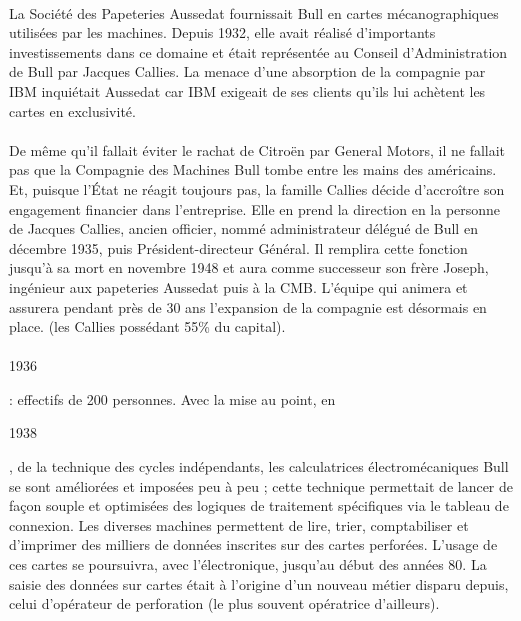 \documentclass{article}
\begin{document}
		\paragraph{}
		La Société des Papeteries Aussedat fournissait Bull en cartes mécanographiques utilisées par les machines. Depuis 
		1932, elle avait réalisé d'importants investissements dans ce domaine et était représentée au Conseil d'Administration 
		de Bull par Jacques Callies. La menace d'une absorption de la compagnie par IBM inquiétait Aussedat car IBM exigeait 
		de ses clients qu'ils lui achètent les cartes en exclusivité.
		\paragraph{}
		De même qu'il fallait éviter le rachat de Citroën par General Motors, il ne fallait pas que la Compagnie des Machines 
		Bull tombe entre les mains des américains. Et, puisque l'État ne réagit toujours pas, la famille Callies décide 
		d'accroître son engagement financier dans l'entreprise. Elle en prend la direction en la personne de Jacques Callies, 
		ancien officier, nommé administrateur délégué de Bull en décembre 1935, puis Président-directeur Général. Il remplira 
		cette fonction jusqu'à sa mort en novembre 1948 et aura comme successeur son frère Joseph, ingénieur aux papeteries 
		Aussedat puis à la CMB. L'équipe qui animera et assurera pendant près de 30 ans l'expansion de la compagnie est 
		désormais en place. (les Callies possédant 55\% du capital).
		\paragraph{}
		\begin{bf}1936\end{bf}: effectifs de 200 personnes.\newline{}
		Avec la mise au point, en \begin{bf}1938\end{bf}, de la technique des cycles indépendants, les calculatrices 
		électromécaniques Bull se sont améliorées et imposées peu à peu ; cette technique permettait de lancer de façon souple 
		et optimisées des logiques de traitement spécifiques via le tableau de connexion. Les diverses machines permettent de 
		lire, trier, comptabiliser et d’imprimer des milliers de données inscrites sur des cartes perforées. L’usage de ces 
		cartes se poursuivra, avec l’électronique, jusqu’au début des années 80. La saisie des données sur cartes était à 
		l’origine d’un nouveau métier disparu depuis, celui d’opérateur de perforation (le plus souvent opératrice d’ailleurs).
\end{document}
